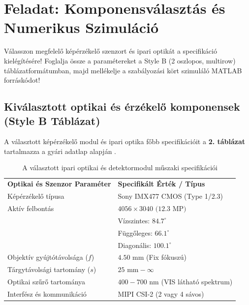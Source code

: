 
\clearpage
\section{Feladat: Komponensválasztás és Numerikus Szimuláció}

\begin{problem}[15 pont]
Válasszon megfelelő képérzékelő szenzort és ipari optikát a specifikáció kielégítésére! Foglalja össze a paramétereket a Style B (2 oszlopos, multirow) táblázatformátumban, majd mellékelje a szabályozási kört szimuláló MATLAB forráskódot!
\end{problem}

\subsection{Kiválasztott optikai és érzékelő komponensek (Style B Táblázat)}
A választott képérzékelő modul és ipari optika főbb specifikációit a \textbf{2. táblázat} tartalmazza a gyári adatlap alapján \cite{sony_imx_datasheet}.

\begin{table}[ht!]
\centering
\renewcommand{\arraystretch}{1.25}
\setlength{\tabcolsep}{8pt}
\setlength{\arrayrulewidth}{2pt}
\begin{tabularx}{\textwidth}{|X!{\color{white}\vrule width 3pt}X|}
\hline
{}
\textbf{Optikai és Szenzor Paraméter} & \textbf{Specifikált Érték / Típus} \\
\tableheaderrule
{}
Képérzékelő típusa & Sony IMX477 CMOS (Type 1/2.3) \\ \hline
{}
Aktív felbontás & $4056 \times 3040\text{ (12.3 MP)}$ \\ \hline
{}
 & Vízszintes: $84.7^\circ$ \\
 & Függőleges: $66.1^\circ$ \\
 & Diagonális: $100.1^\circ$ \\ \hline
{}
Objektív gyújtótávolsága ($f$) & $4.50\text{ mm}$ (Fix fókuszú) \\ \hline
{}
Tárgytávolsági tartomány ($s$) & $25\text{ mm} - \infty$ \\ \hline
{}
Optikai szűrő tartománya & $400 - 700\text{ nm}$ (VIS látható spektrum) \\ \hline
{}
Interfész és kommunikáció & MIPI CSI-2 (2 vagy 4 sávos) \\ \hline
\end{tabularx}
\caption{A választott ipari optikai és detektormodul műszaki specifikációi \cite{sony_imx_datasheet}}
\label{tab:spec_tabla}
\end{table}

